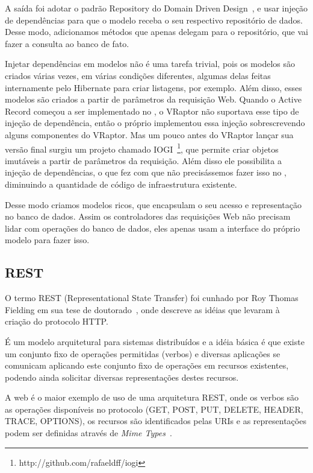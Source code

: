 A saída foi adotar o padrão Repository do Domain Driven Design~\cite{ddd}, e usar injeção de dependências para que o modelo receba o seu respectivo repositório de dados. Desse modo, adicionamos métodos que apenas delegam para o repositório, que vai fazer a consulta ao banco de fato.

Injetar dependências em modelos não é uma tarefa trivial, pois os modelos são criados várias vezes, em várias condições diferentes, algumas delas feitas internamente pelo Hibernate para criar listagens, por exemplo. Além disso, esses modelos são criados a partir de parâmetros da requisição Web. Quando o Active Record começou a ser implementado no \calopsita, o VRaptor não suportava esse tipo de injeção de dependência, então o próprio \calopsita implementou essa injeção sobrescrevendo alguns componentes do VRaptor. Mas um pouco antes do VRaptor lançar sua versão final surgiu um projeto \opensource chamado IOGI~\footnote{http://github.com/rafaeldff/iogi}, que permite criar objetos imutáveis a partir de parâmetros da requisição. Além disso ele possibilita a injeção de dependências, o que fez com que não precisássemos fazer isso no \calopsita, diminuindo a quantidade de código de infraestrutura existente.

Desse modo criamos modelos ricos, que encapsulam o seu acesso e representação no banco de dados. Assim os controladores das requisições Web não precisam lidar com operações do banco de dados, eles apenas usam a interface do próprio modelo para fazer isso.

\subsection{REST}
O termo REST (Representational State Transfer) foi cunhado por Roy Thomas Fielding em sua tese de doutorado~\cite{rest-roy}, onde descreve as idéias que levaram à criação do protocolo HTTP.

É um modelo arquitetural para sistemas distribuídos e a idéia básica é que existe um conjunto fixo de operações permitidas (verbos) e diversas aplicações se comunicam aplicando este conjunto fixo de operações em recursos existentes, podendo ainda solicitar diversas representações destes recursos.

A web é o maior exemplo de uso de uma arquitetura REST, onde os verbos são as operações disponíveis no protocolo (GET, POST, PUT, DELETE, HEADER, TRACE, OPTIONS), os recursos são identificados pelas URIs e as representações podem ser definidas através de \textit{Mime Types}~\cite{mimetypes}.

